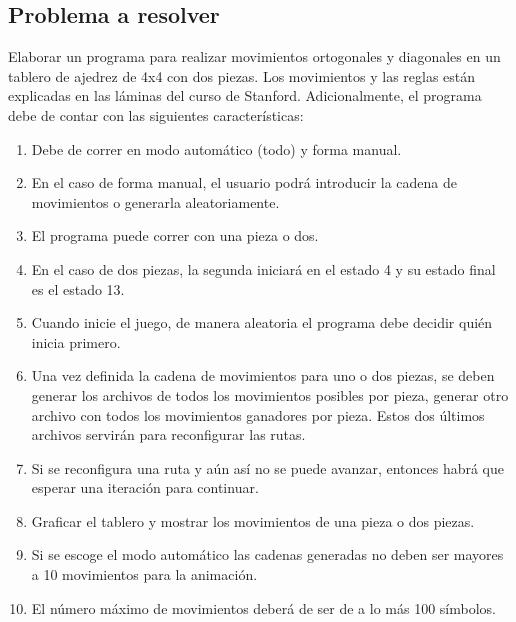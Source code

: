 \documentclass{article}
\begin{document}
\subsection{Problema a resolver}
Elaborar un programa para realizar movimientos ortogonales y diagonales en un tablero de ajedrez de 4x4 con dos piezas. Los movimientos y las reglas están explicadas en las láminas del curso de Stanford.\newline
Adicionalmente, el programa debe de contar con las siguientes características:
\begin{enumerate}
    \item Debe de correr en modo automático (todo) y forma manual.
    \item En el caso de forma manual, el usuario podrá introducir la cadena de movimientos o generarla aleatoriamente.
    \item El programa puede correr con una pieza o dos.
    \item En el caso de dos piezas, la segunda iniciará en el estado 4 y su estado final es el estado 13.
    \item  Cuando inicie el juego, de manera aleatoria el programa debe decidir quién inicia primero.
    \item Una vez definida la cadena de movimientos para uno o dos piezas, se deben generar los archivos de todos los movimientos posibles por pieza, generar otro archivo con todos los movimientos ganadores por pieza. Estos dos últimos archivos servirán para reconfigurar las rutas.
    \item Si se reconfigura una ruta y aún así no se puede avanzar, entonces habrá que esperar una iteración para continuar.
    \item Graficar el tablero y mostrar los movimientos de una pieza o dos piezas.
    \item Si se escoge el modo automático las cadenas generadas no deben ser mayores a 10 movimientos para la animación.
    \item El número máximo de movimientos deberá de ser de a lo más 100 símbolos.
\end{enumerate}
\end{document}
